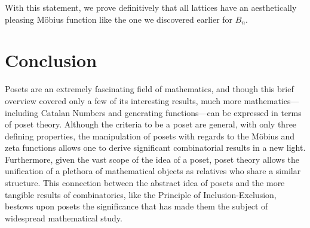 \documentclass{article} %
\theoremstyle{definition}
\theoremstyle{plain}
\begin{document}
With this statement, we prove definitively that all lattices have an aesthetically pleasing M\"{o}bius function like the one we discovered earlier for $B_n$.

\section{Conclusion}
Posets are an extremely fascinating field of mathematics, and though this brief overview covered only a few of its interesting results, much more mathematics---including Catalan Numbers and generating functions---can be expressed in terms of poset theory. Although the criteria to be a poset are general, with only three defining properties, the manipulation of posets with regards to the M\"{o}bius and zeta functions allows one to derive significant combinatorial results in a new light. Furthermore, given the vast scope of the idea of a poset, poset theory allows the unification of a plethora of mathematical objects as relatives who share a similar structure. This connection between the abstract idea of posets and the more tangible results of combinatorics, like the Principle of Inclusion-Exclusion, bestows upon posets the significance that has made them the subject of widespread mathematical study.


\end{document}
